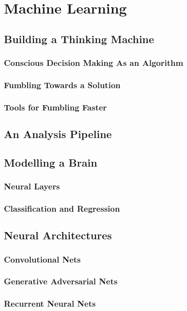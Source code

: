 \chapter{Machine Learning}

\section{Building a Thinking Machine}

\subsection{Conscious Decision Making As an Algorithm}

\subsection{Fumbling Towards a Solution}

\subsection{Tools for Fumbling Faster}

\section{An Analysis Pipeline}

\section{Modelling a Brain}

\subsection{Neural Layers}

\subsection{Classification and Regression}

\section{Neural Architectures}

\subsection{Convolutional Nets}

\subsection{Generative Adversarial Nets}

\subsection{Recurrent Neural Nets}